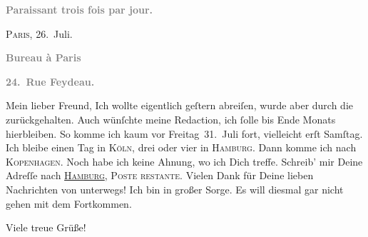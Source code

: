 \pstart
           \begin{otherlanguage}{french}\textcolor{gray}{\textbf{\textbf{Paraissant trois fois par jour.}}}\end{otherlanguage}\hfill \textsc{Paris}, 26. Juli.\pend
           
\pstart
           \begin{otherlanguage}{french}\textcolor{gray}{\textbf{\textbf{Bureau à Paris}}}\end{otherlanguage}\pend
           
\pstart
           \begin{otherlanguage}{french}\textcolor{gray}{\textbf{\textbf{24. Rue Feydeau.}}}\end{otherlanguage}\pend
           
\pstart\center{}Mein lieber Freund,\pend\vspace{0.5em}
\pstart
           Ich wollte eigentlich geſtern abreiſen, wurde aber
               durch die \label{K_L02783-1v}\label{K_L02783-1} zurückgehalten. Auch wünſchte meine Redaction, ich{ }ſolle bis Ende Monats hierbleiben. So komme ich kaum vor Freitag 31. Juli fort, vielleicht erſt Samſtag. Ich bleibe einen Tag in \textsc{Köln}, drei oder vier in \textsc{Hamburg}. Dann komme ich nach \textsc{Kopenhagen}. Noch habe ich keine Ahnung, wo {\pb}ich Dich
               treffe. Schreib’ mir Deine Adreſſe nach \textsc{\uline{Hamburg}}, \textsc{Poste restante}. Vielen Dank für Deine lieben
               Nachrichten von unterwegs! Ich bin in großer Sorge. Es will diesmal gar nicht gehen
               mit dem Fortkommen.\pend
           
\pstart
           Viele treue Grüße!\pend
           
